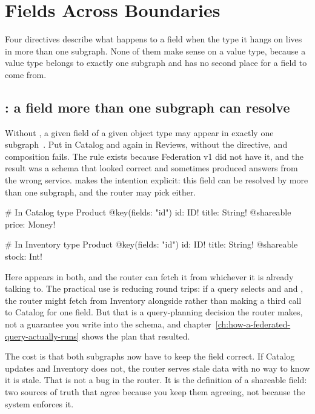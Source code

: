 \section{Fields Across Boundaries}
\label{sec:ch06-fields-across-boundaries}
%

Four directives describe what happens to a field when the type it hangs on lives
in more than one subgraph. None of them make sense on a value type, because a
value type belongs to exactly one subgraph and has no second place for a field
to come from.

\subsection*{: a field more than one subgraph can resolve}

%
Without , a given field of a given object type may appear in
exactly one subgraph~\autocite{apollo2026compositionrules}. Put  in Catalog and again in Reviews,
without the directive, and composition fails. The rule exists because Federation
v1 did not have it, and the result was a schema that looked correct and
sometimes produced answers from the wrong service.  makes the
intention explicit: this field can be resolved by more than one subgraph, and
the router may pick either.

\begin{graphqlsdl}
# In Catalog
type Product @key(fields: "id") {
  id: ID!
  title: String! @shareable
  price: Money!
}

# In Inventory
type Product @key(fields: "id") {
  id: ID!
  title: String! @shareable
  stock: Int!
}
\end{graphqlsdl}

Here  appears in both, and the router can fetch it from whichever it
is already talking to. The practical use is reducing round trips: if a query
selects  and  and , the router might fetch
 from Inventory alongside  rather than making a third
call to Catalog for one field. But that is a query-planning decision the router
makes, not a guarantee you write into the schema, and
chapter~\ref{ch:how-a-federated-query-actually-runs} shows the plan that
resulted.

The cost is that both subgraphs now have to keep the field correct. If Catalog
updates  and Inventory does not, the router serves stale data with
no way to know it is stale. That is not a bug in the router. It is the
definition of a shareable field: two sources of truth that agree because you
keep them agreeing, not because the system enforces it.

